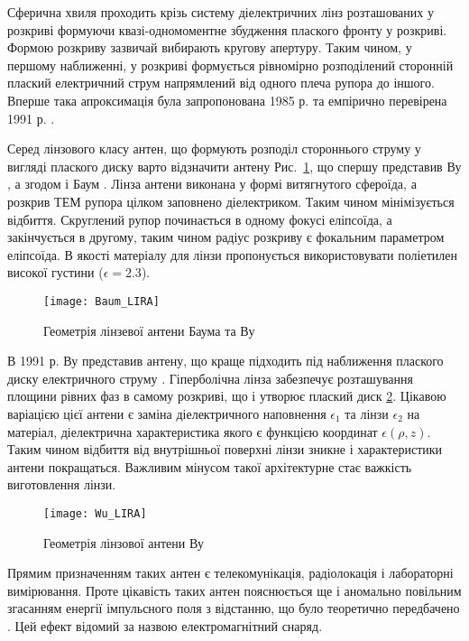 Сферична хвиля проходить крізь систему діелектричних лінз розташованих у 
розкриві формуючи квазі-одномоментне збудження плаского фронту у розкриві. 
Формою розкриву зазвичай вибирають кругову апертуру. Таким чином, у першому 
наближенні, у розкриві формується рівномірно розподілений сторонній плаский 
електричний струм напрямлений від одного плеча рупора до іншого. Вперше така
апроксимація була запропонована 1985 р. \cite{imp:Wu1985} та 
емпірично перевірена 1991 р. \cite{imp:Wu1991}.

Серед лінзового класу антен, що формують розподіл стороннього струму у вигляді 
плаского диску варто відзначити антену Рис.~\ref{fig:lira_baum}, що спершу
представив Ву \cite{imp:Wu1987}, а згодом і Баум \cite{imp:BaumSSN0377}. 
Лінза антени виконана у формі витягнутого сфероїда, а розкрив ТЕМ рупора 
цілком заповнено діелектриком. Таким чином мінімізується відбиття. 
Скруглений рупор починається в одному фокусі еліпсоїда, а закінчується в 
другому, таким чином радіус розкриву є фокальним параметром еліпсоїда.
В якості матеріалу для лінзи пропонується використовувати поліетилен 
високої густини ($\epsilon = 2.3 $).

\begin{figure}[htbp] \begin{center}
\texttt{[image: Baum\_LIRA]}
\caption{Геометрія лінзевої антени Баума та Ву} \label{fig:lira_baum}
\end{center} \end{figure}

В 1991 р. Ву представив антену, що краще підходить під наближення  
плаского диску електричного струму \cite{imp:Wu1991}. Гіперболічна лінза 
забезпечує розташування площини рівних фаз в самому розкриві, що і утворює
плаский диск \ref{fig:lira_wu}. Цікавою варіацією цієї антени є заміна 
діелектричного наповнення $ \epsilon_1 $ та лінзи $ \epsilon_2 $ на матеріал,
діелектрична характеристика якого є функцією координат $ \epsilon(\rho, z) $.
Таким чином відбиття від внутрішньої поверхні лінзи зникне і характеристики 
антени покращаться. Важливим мінусом такої архітектурне стає важкість 
виготовлення лінзи.

\begin{figure}[htbp] \begin{center}
\texttt{[image: Wu\_LIRA]}
\caption{Геометрія лінзової антени Ву} \label{fig:lira_wu}
\end{center} \end{figure}

Прямим призначенням таких антен є телекомунікація, радіолокація і лабораторні 
вимірювання. Проте цікавість таких антен пояснюється ще і аномально повільним
згасанням енергії імпульсного поля з відстанню, що було теоретично 
передбачено \cite{imp:Wu1987}. Цей ефект відомий за назвою електромагнітний 
снаряд.


